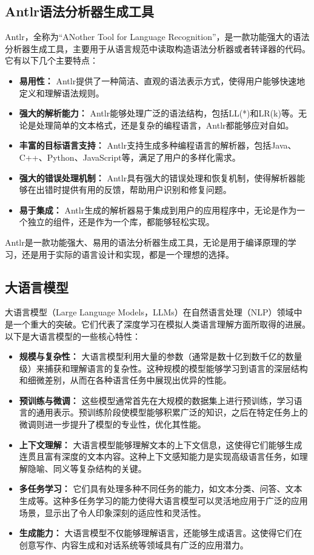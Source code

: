 \subsection{Antlr语法分析器生成工具}

Antlr，全称为“ANother Tool for Language Recognition”，是一款功能强大的语法分析器生成工具，主要用于从语言规范中读取构造语法分析器或者转译器的代码。它有以下几个主要特点：

\begin{itemize}
    \item \textbf{易用性：} Antlr提供了一种简洁、直观的语法表示方式，使得用户能够快速地定义和理解语法规则。
    \item \textbf{强大的解析能力：} Antlr能够处理广泛的语法结构，包括LL(*)和LR(k)等。无论是处理简单的文本格式，还是复杂的编程语言，Antlr都能够应对自如。
    \item \textbf{丰富的目标语言支持：} Antlr支持生成多种编程语言的解析器，包括Java、C++、Python、JavaScript等，满足了用户的多样化需求。
    \item \textbf{强大的错误处理机制：} Antlr具有强大的错误处理和恢复机制，使得解析器能够在出错时提供有用的反馈，帮助用户识别和修复问题。
    \item \textbf{易于集成：} Antlr生成的解析器易于集成到用户的应用程序中，无论是作为一个独立的组件，还是作为一个库，都能够轻松实现。
\end{itemize}

Antlr是一款功能强大、易用的语法分析器生成工具，无论是用于编译原理的学习，还是用于实际的语言设计和实现，都是一个理想的选择。

\subsection{大语言模型}
大语言模型（Large Language Models，LLMs）在自然语言处理（NLP）领域中是一个重大的突破。它们代表了深度学习在模拟人类语言理解方面所取得的进展。以下是大语言模型的一些核心特性：

\begin{itemize}
    \item \textbf{规模与复杂性：} 大语言模型利用大量的参数（通常是数十亿到数千亿的数量级）来捕获和理解语言的复杂性。这种规模的模型能够学习到语言的深层结构和细微差别，从而在各种语言任务中展现出优异的性能。
    \item \textbf{预训练与微调：} 这些模型通常首先在大规模的数据集上进行预训练，学习语言的通用表示。预训练阶段使模型能够积累广泛的知识，之后在特定任务上的微调则进一步提升了模型的专业性，优化其性能。
    \item \textbf{上下文理解：} 大语言模型能够理解文本的上下文信息，这使得它们能够生成连贯且富有深度的文本内容。这种上下文感知能力是实现高级语言任务，如理解隐喻、同义等复杂结构的关键。
    \item \textbf{多任务学习：} 它们具有处理多种不同任务的能力，如文本分类、问答、文本生成等。这种多任务学习的能力使得大语言模型可以灵活地应用于广泛的应用场景，显示出了令人印象深刻的适应性和灵活性。
    \item \textbf{生成能力：} 大语言模型不仅能够理解语言，还能够生成语言。这使得它们在创意写作、内容生成和对话系统等领域具有广泛的应用潜力。
\end{itemize}

